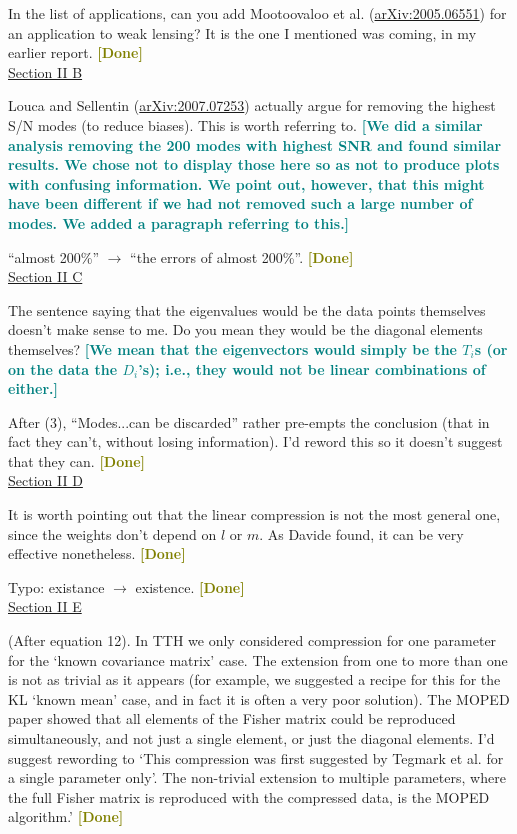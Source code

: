 \documentclass{article}
\newcommand\reply[1]{{\bf {\textcolor{teal}{[#1]}}}}
\newcommand\done{{\bf {\textcolor{olive}{[Done]}}}}
\begin{document}
	In the list of applications, can you add Mootoovaloo et al. (\href{https://arxiv.org/pdf/2005.06551.pdf}{arXiv:2005.06551}) for an application to weak lensing?  It is the one I mentioned was coming, in my earlier report. \done\\
	
	\underline{Section II B}
	
	Louca and Sellentin (\href{https://arxiv.org/pdf/2007.07253.pdf}{arXiv:2007.07253}) actually argue for removing the highest S/N modes (to reduce biases).  This is worth referring to. \reply{We did a similar analysis removing the 200 modes with highest SNR and found similar results. We chose not to display those here so as not to produce plots with confusing information. We point out, however, that this might have been different if we had not removed such a large number of modes. We added a paragraph referring to this.}
	
	“almost 200\%” $\rightarrow$ “the errors of almost 200\%”. \done\\
	
	\underline{Section II C}
	
	The sentence saying that the eigenvalues would be the data points themselves doesn’t make sense to me.  Do you mean they would be the diagonal elements themselves? \reply{We mean that the eigenvectors would simply be the $T_i$s (or on the data the $D_i$’s); i.e., they would not be linear combinations of either.}
	
	After (3), “Modes...can be discarded” rather pre-empts the conclusion (that in fact they can’t, without losing information).  I’d reword this so it doesn’t suggest that they can. \done\\
	
	\underline{Section II D}
	
	It is worth pointing out that the linear compression is not the most general one, since the weights don’t depend on $l$ or $m$.  As Davide found, it can be very effective nonetheless. \done
	
	Typo: existance $\rightarrow$ existence. \done\\
	
	\underline{Section II E}
	
	(After equation 12). In TTH we only considered compression for one parameter for the ‘known covariance matrix’ case.  The extension from one to more than one is not as trivial as it appears (for example, we suggested a recipe for this for the KL ‘known mean’ case, and in fact it is often a very poor solution).  The MOPED paper showed that all elements of the Fisher matrix could be reproduced simultaneously, and not just a single element, or just the diagonal elements.  I’d suggest rewording to ‘This compression was first suggested by Tegmark et al. for a single parameter only’.  The non-trivial extension to multiple parameters, where the full Fisher matrix is reproduced with the compressed data, is the MOPED algorithm.’ \done\\
	
\end{document}
